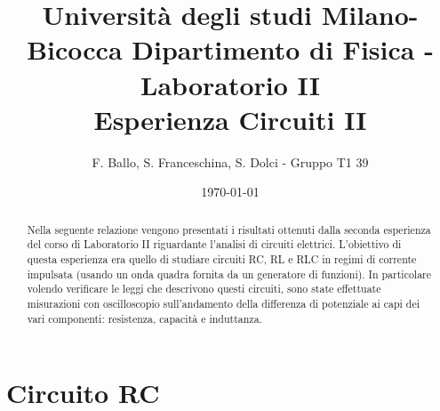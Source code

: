 \documentclass[letterpaper,12pt]{article}
\begin{document}
\title{{\small Università degli studi Milano-Bicocca  Dipartimento di Fisica - Laboratorio II }\\
    Esperienza Circuiti II}
\author{F. Ballo, S. Franceschina, S. Dolci - Gruppo T1 39}
\date{\today}
\maketitle
\thispagestyle{logoheader}


\begin{abstract}
Nella seguente relazione vengono presentati i risultati ottenuti dalla seconda esperienza del corso di Laboratorio II riguardante l'analisi di circuiti elettrici. L'obiettivo di questa esperienza era quello di studiare circuiti RC, RL e RLC in regimi di corrente impulsata (usando un onda quadra fornita da un generatore di funzioni). In particolare volendo verificare le leggi che descrivono questi circuiti, sono state effettuate misurazioni con oscilloscopio sull'andamento della differenza di potenziale ai capi dei vari componenti: resistenza, capacità e induttanza.

\begin{adjustwidth}{-1cm}{-1cm}


\end{adjustwidth}
\end{abstract}
\tableofcontents
\newpage

\section{Circuito RC}
\end{document}
